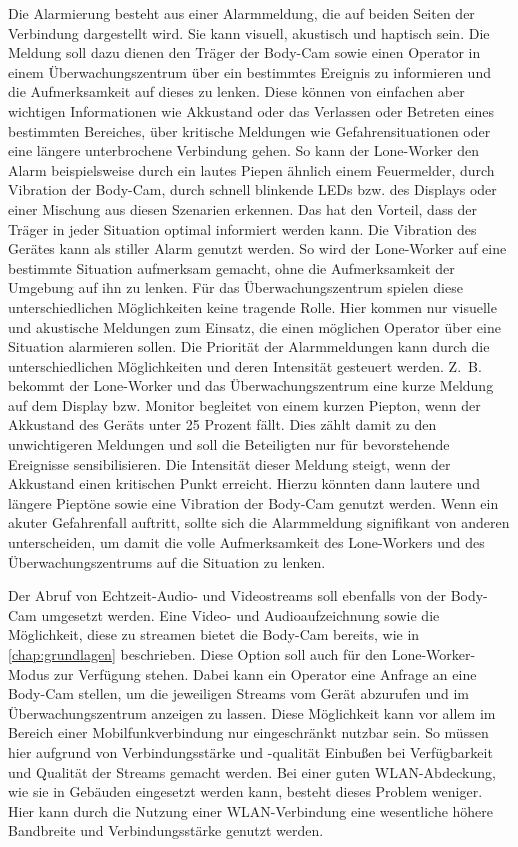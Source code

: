 \documentclass[thesis.tex]{subfiles}
\begin{document}
Die Alarmierung besteht aus einer Alarmmeldung, die auf beiden Seiten der Verbindung dargestellt wird.
Sie kann visuell, akustisch und haptisch sein.
Die Meldung soll dazu dienen den Träger der Body-Cam sowie einen Operator in einem Überwachungszentrum über ein bestimmtes Ereignis zu informieren und die Aufmerksamkeit auf dieses zu lenken.
Diese können von einfachen aber wichtigen Informationen wie Akkustand oder das Verlassen oder Betreten eines bestimmten Bereiches, über kritische Meldungen wie Gefahrensituationen oder eine längere unterbrochene Verbindung gehen.
So kann der Lone-Worker den Alarm beispielsweise durch ein lautes Piepen ähnlich einem Feuermelder, durch Vibration der Body-Cam, durch schnell blinkende LEDs bzw. des Displays oder einer Mischung aus diesen Szenarien erkennen.
Das hat den Vorteil, dass der Träger in jeder Situation optimal informiert werden kann.
Die Vibration des Gerätes kann als stiller Alarm genutzt werden.
So wird der Lone-Worker auf eine bestimmte Situation aufmerksam gemacht, ohne die Aufmerksamkeit der Umgebung auf ihn zu lenken.
Für das Überwachungszentrum spielen diese unterschiedlichen Möglichkeiten keine tragende Rolle.
Hier kommen nur visuelle und akustische Meldungen zum Einsatz, die einen möglichen Operator über eine Situation alarmieren sollen.
Die Priorität der Alarmmeldungen kann durch die unterschiedlichen Möglichkeiten und deren Intensität gesteuert werden.
Z.~B. bekommt der Lone-Worker und das Überwachungszentrum eine kurze Meldung auf dem Display bzw. Monitor begleitet von einem kurzen Piepton, wenn der Akkustand des Geräts unter 25 Prozent fällt.
Dies zählt damit zu den unwichtigeren Meldungen und soll die Beteiligten nur für bevorstehende Ereignisse sensibilisieren.
Die Intensität dieser Meldung steigt, wenn der Akkustand einen kritischen Punkt erreicht.
Hierzu könnten dann lautere und längere Pieptöne sowie eine Vibration der Body-Cam genutzt werden.
Wenn ein akuter Gefahrenfall auftritt, sollte sich die Alarmmeldung signifikant von anderen unterscheiden, um damit die volle Aufmerksamkeit des Lone-Workers und des Überwachungszentrums auf die Situation zu lenken.

Der Abruf von Echtzeit-Audio- und Videostreams soll ebenfalls von der Body-Cam umgesetzt werden.
Eine Video- und Audioaufzeichnung sowie die Möglichkeit, diese zu streamen bietet die Body-Cam bereits, wie in \autoref{chap:grundlagen} beschrieben.
Diese Option soll auch für den Lone-Worker-Modus zur Verfügung stehen.
Dabei kann ein Operator eine Anfrage an eine Body-Cam stellen, um die jeweiligen Streams vom Gerät abzurufen und im Überwachungszentrum anzeigen zu lassen.
Diese Möglichkeit kann vor allem im Bereich einer Mobilfunkverbindung nur eingeschränkt nutzbar sein.
So müssen hier aufgrund von Verbindungsstärke und -qualität Einbußen bei Verfügbarkeit und Qualität der Streams gemacht werden.
Bei einer guten WLAN-Abdeckung, wie sie in Gebäuden eingesetzt werden kann, besteht dieses Problem weniger.
Hier kann durch die Nutzung einer WLAN-Verbindung eine wesentliche höhere Bandbreite und Verbindungsstärke genutzt werden.
\end{document}
